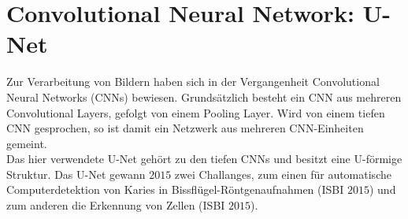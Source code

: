 \section{Convolutional Neural Network: U-Net}
\label{sec:Model}
Zur Verarbeitung von Bildern haben sich in der Vergangenheit Convolutional Neural Networks (CNNs) bewiesen.
Grundsätzlich besteht ein CNN aus mehreren Convolutional Layers, gefolgt von einem Pooling Layer.
Wird von einem tiefen CNN gesprochen, so ist damit ein Netzwerk aus mehreren CNN-Einheiten gemeint.
\\
Das hier verwendete U-Net gehört zu den tiefen CNNs und besitzt eine U-förmige Struktur.
Das U-Net gewann $2015$ zwei Challanges, zum einen für automatische Computerdetektion von Karies in Bissflügel-Röntgenaufnahmen (ISBI $2015$) und zum anderen die Erkennung von Zellen (ISBI $2015$).\cite{RFB15a}

